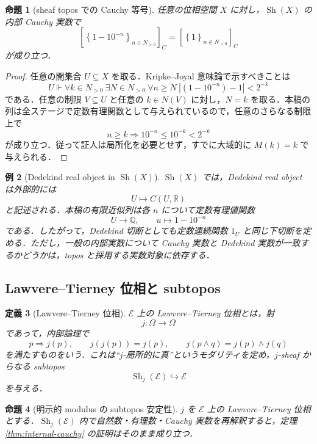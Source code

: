\documentclass[a4paper,11pt]{ltjsarticle}
\theoremstyle{jpdef}
\newtheorem{definition}{定義}[section]
\newtheorem{example}[definition]{例}
\theoremstyle{jpthm}
\newtheorem{proposition}[definition]{命題}
\newcommand{\Q}{\mathbb{Q}}
\newcommand{\R}{\mathbb{R}}
\newcommand{\seq}[2]{\left\{#1\right\}_{#2}}
\newcommand{\Sh}{\operatorname{Sh}}
\begin{document}
\begin{proposition}[sheaf topos での Cauchy 等号]
任意の位相空間 \(X\) に対し，\(\Sh(X)\) の内部 Cauchy 実数で
\[
  [\seq{1-10^{-n}}{n\in N_{>0}}]_C=[\seq{1}{n\in N_{>0}}]_C
\]
が成り立つ．
\end{proposition}

\begin{proof}
任意の開集合 \(U\subseteq X\) を取る．Kripke--Joyal 意味論で示すべきことは
\[
  U\Vdash
  \forall k\in N_{>0}\ \exists N\in N_{>0}\ \forall n\ge N\
  |(1-10^{-n})-1|<2^{-k}
\]
である．任意の制限 \(V\subseteq U\) と任意の \(k\in N(V)\) に対し，\(N=k\) を取る．本稿の列は全ステージで定数有理関数として与えられているので，任意のさらなる制限上で
\[
  n\ge k\Rightarrow 10^{-n}\le10^{-k}<2^{-k}
\]
が成り立つ．従って証人は局所化を必要とせず，すでに大域的に \(M(k)=k\) で与えられる．
\end{proof}

\begin{example}[Dedekind real object in \(\Sh(X)\)]
\(\Sh(X)\) では，Dedekind real object は外部的には
\[
  U\longmapsto C(U,\R)
\]
と記述される．本稿の有限近似列は各 \(n\) について定数有理値関数
\[
  U\to\Q,
  \qquad
  u\mapsto 1-10^{-n}
\]
である．したがって，Dedekind 切断としても定数連続関数 \(1_U\) と同じ下切断を定める．ただし，一般の内部実数について Cauchy 実数と Dedekind 実数が一致するかどうかは，topos と採用する実数対象に依存する．
\end{example}

\subsection{Lawvere--Tierney 位相と subtopos}

\begin{definition}[Lawvere--Tierney 位相]
\(\mathcal E\) 上の Lawvere--Tierney 位相とは，射
\[
  j:\Omega\to\Omega
\]
であって，内部論理で
\[
  p\Rightarrow j(p),\qquad
  j(j(p))=j(p),\qquad
  j(p\land q)=j(p)\land j(q)
\]
を満たすものをいう．これは``\(j\)-局所的に真''というモダリティを定め，\(j\)-sheaf からなる subtopos
\[
  \Sh_j(\mathcal E)\hookrightarrow \mathcal E
\]
を与える．
\end{definition}

\begin{proposition}[明示的 modulus の subtopos 安定性]
\(j\) を \(\mathcal E\) 上の Lawvere--Tierney 位相とする．\(\Sh_j(\mathcal E)\) 内で自然数・有理数・Cauchy 実数を再解釈すると，定理 \ref{thm:internal-cauchy} の証明はそのまま成り立つ．
\end{proposition}
\end{document}
